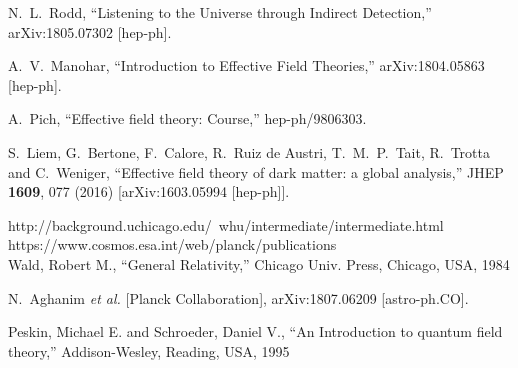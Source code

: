 \documentclass[12pt]{report}
\begin{document}
\begin{thebibliography}{}
 N.~L.~Rodd,
  ``Listening to the Universe through Indirect Detection,''
  arXiv:1805.07302 [hep-ph].

 A.~V.~Manohar,
  ``Introduction to Effective Field Theories,''
  arXiv:1804.05863 [hep-ph].
  
 A.~Pich,
  ``Effective field theory: Course,''
  hep-ph/9806303.

 S.~Liem, G.~Bertone, F.~Calore, R.~Ruiz de Austri, T.~M.~P.~Tait, R.~Trotta and C.~Weniger,
  ``Effective field theory of dark matter: a global analysis,''
  JHEP {\bf 1609}, 077 (2016)
  [arXiv:1603.05994 [hep-ph]].
  
http://background.uchicago.edu/~whu/intermediate/intermediate.html\\

https://www.cosmos.esa.int/web/planck/publications\\


Wald, Robert M.,
``General Relativity,''
Chicago Univ. Press, Chicago, USA, 1984


 N.~Aghanim {\it et al.} [Planck Collaboration],
  arXiv:1807.06209 [astro-ph.CO].
  
Peskin, Michael E. and Schroeder, Daniel V.,
``An Introduction to quantum field theory,''
Addison-Wesley, Reading, USA, 1995


\end{thebibliography}
\end{document}
